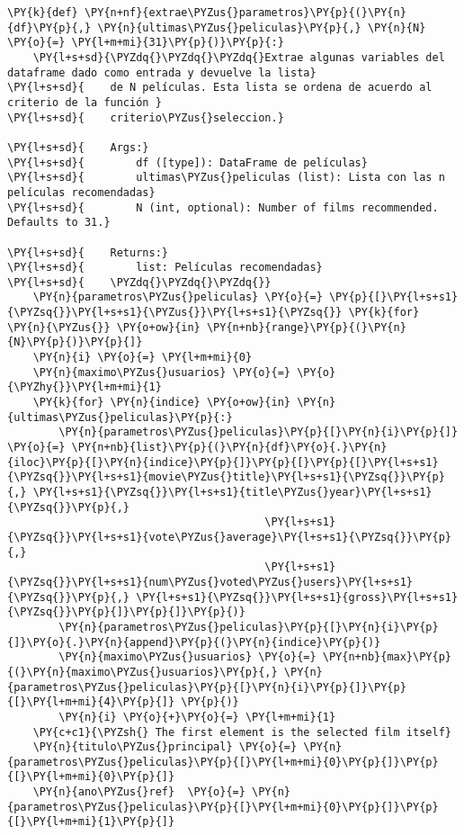     \begin{tcolorbox}[breakable, size=fbox, boxrule=1pt, pad at break*=1mm,colback=cellbackground, colframe=cellborder]
\begin{Verbatim}[commandchars=\\\{\}]
\PY{k}{def} \PY{n+nf}{extrae\PYZus{}parametros}\PY{p}{(}\PY{n}{df}\PY{p}{,} \PY{n}{ultimas\PYZus{}peliculas}\PY{p}{,} \PY{n}{N} \PY{o}{=} \PY{l+m+mi}{31}\PY{p}{)}\PY{p}{:}
    \PY{l+s+sd}{\PYZdq{}\PYZdq{}\PYZdq{}Extrae algunas variables del dataframe dado como entrada y devuelve la lista}
\PY{l+s+sd}{    de N películas. Esta lista se ordena de acuerdo al criterio de la función }
\PY{l+s+sd}{    criterio\PYZus{}seleccion.}

\PY{l+s+sd}{    Args:}
\PY{l+s+sd}{        df ([type]): DataFrame de películas}
\PY{l+s+sd}{        ultimas\PYZus{}peliculas (list): Lista con las n películas recomendadas}
\PY{l+s+sd}{        N (int, optional): Number of films recommended. Defaults to 31.}

\PY{l+s+sd}{    Returns:}
\PY{l+s+sd}{        list: Películas recomendadas}
\PY{l+s+sd}{    \PYZdq{}\PYZdq{}\PYZdq{}}
    \PY{n}{parametros\PYZus{}peliculas} \PY{o}{=} \PY{p}{[}\PY{l+s+s1}{\PYZsq{}}\PY{l+s+s1}{\PYZus{}}\PY{l+s+s1}{\PYZsq{}} \PY{k}{for} \PY{n}{\PYZus{}} \PY{o+ow}{in} \PY{n+nb}{range}\PY{p}{(}\PY{n}{N}\PY{p}{)}\PY{p}{]}
    \PY{n}{i} \PY{o}{=} \PY{l+m+mi}{0}
    \PY{n}{maximo\PYZus{}usuarios} \PY{o}{=} \PY{o}{\PYZhy{}}\PY{l+m+mi}{1}
    \PY{k}{for} \PY{n}{indice} \PY{o+ow}{in} \PY{n}{ultimas\PYZus{}peliculas}\PY{p}{:}
        \PY{n}{parametros\PYZus{}peliculas}\PY{p}{[}\PY{n}{i}\PY{p}{]} \PY{o}{=} \PY{n+nb}{list}\PY{p}{(}\PY{n}{df}\PY{o}{.}\PY{n}{iloc}\PY{p}{[}\PY{n}{indice}\PY{p}{]}\PY{p}{[}\PY{p}{[}\PY{l+s+s1}{\PYZsq{}}\PY{l+s+s1}{movie\PYZus{}title}\PY{l+s+s1}{\PYZsq{}}\PY{p}{,} \PY{l+s+s1}{\PYZsq{}}\PY{l+s+s1}{title\PYZus{}year}\PY{l+s+s1}{\PYZsq{}}\PY{p}{,}
                                        \PY{l+s+s1}{\PYZsq{}}\PY{l+s+s1}{vote\PYZus{}average}\PY{l+s+s1}{\PYZsq{}}\PY{p}{,} 
                                        \PY{l+s+s1}{\PYZsq{}}\PY{l+s+s1}{num\PYZus{}voted\PYZus{}users}\PY{l+s+s1}{\PYZsq{}}\PY{p}{,} \PY{l+s+s1}{\PYZsq{}}\PY{l+s+s1}{gross}\PY{l+s+s1}{\PYZsq{}}\PY{p}{]}\PY{p}{]}\PY{p}{)}
        \PY{n}{parametros\PYZus{}peliculas}\PY{p}{[}\PY{n}{i}\PY{p}{]}\PY{o}{.}\PY{n}{append}\PY{p}{(}\PY{n}{indice}\PY{p}{)}
        \PY{n}{maximo\PYZus{}usuarios} \PY{o}{=} \PY{n+nb}{max}\PY{p}{(}\PY{n}{maximo\PYZus{}usuarios}\PY{p}{,} \PY{n}{parametros\PYZus{}peliculas}\PY{p}{[}\PY{n}{i}\PY{p}{]}\PY{p}{[}\PY{l+m+mi}{4}\PY{p}{]} \PY{p}{)}
        \PY{n}{i} \PY{o}{+}\PY{o}{=} \PY{l+m+mi}{1}
    \PY{c+c1}{\PYZsh{} The first element is the selected film itself}
    \PY{n}{titulo\PYZus{}principal} \PY{o}{=} \PY{n}{parametros\PYZus{}peliculas}\PY{p}{[}\PY{l+m+mi}{0}\PY{p}{]}\PY{p}{[}\PY{l+m+mi}{0}\PY{p}{]}
    \PY{n}{ano\PYZus{}ref}  \PY{o}{=} \PY{n}{parametros\PYZus{}peliculas}\PY{p}{[}\PY{l+m+mi}{0}\PY{p}{]}\PY{p}{[}\PY{l+m+mi}{1}\PY{p}{]}
    

\end{Verbatim}
\end{tcolorbox}
